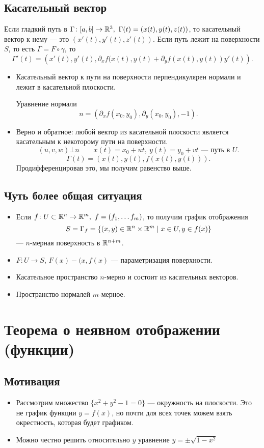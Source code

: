 \subsection{Касательный вектор}
\begin{defn}
	Если гладкий путь в $ \Gamma \colon [a,b] \to  \mathbb{R}^3, ~\Gamma (t) = \left( x(t), y(t), z(t) \right)  $, то {\sf касательный вектор} к нему --- это $ \left( x'(t), y'(t),z'(t) \right) $.  Если путь лежит на поверхности $ S$, то есть $ \Gamma = F \circ \gamma $, то
	\[
	    \Gamma '(t) = \left( x'(t), y'(t), \partial _xf(x(t), y(t) + \partial _yf(x(t), y(t))y'(t) \right)
	.\]
\end{defn}
\begin{itemize}
    \item Касательный вектор к пути на поверхности перпендикулярен нормали и лежит в касательной плоскости.

	{\sf Уравнение нормали}
	\[
	    n=\left( \partial _xf(x_0, y_0), \partial _y(x_0, y_0), -1 \right)
	.\]
    \item Верно и обратное:  любой вектор из касательной плоскости является касательным к некоторому пути на поверхности.
	\[
	    (u, v, w) \bot n \qquad x(t) = x_0+ ut, ~y(t) =y_0+vt \text{ --- путь в } U
	.\]
	\[
	    \Gamma (t) = (x(t), y(t), f(x(t), y(t)))
	.\]
	Продифференцировав это, мы получим равенство выше.
\end{itemize}
\subsection{Чуть более общая ситуация}
\begin{itemize}
    \item Если $ f\colon U \subset \mathbb{R}^{n} \to  \mathbb{R}^{m} , ~ f= (f_1, \ldots f_m)$, то получим график отображения
	\[
	    S = \Gamma _f = \{(x, y) \in \mathbb{R}^{n} \times \mathbb{R}^{m} \mid x \in U, y \in f(x)\}
	\]
	--- $ n$-мерная поверхность в  $ \mathbb{R}^{n+m}$.
    \item $ F\colon U \to  S$, $ F(x) - (x, f(x)$ --- параметризация поверхности.
    \item Касательное пространство $ n$-мерно и состоит из касательных векторов.
    \item Пространство нормалей  $ m$-мерное.
\end{itemize}
\section{Теорема о неявном отображении (функции)}
\subsection{Мотивация}
\begin{itemize}
    \item
	Рассмотрим множество $ \{x^2+y^2-1= 0\}$ --- окружность на плоскости. Это не график функции $ y = f(x)$, но почти для всех точек можем взять окрестность, которая будет графиком.
    \item  Можно честно решить относительно $ y$ уравнение  $ y = \pm \sqrt{1-x^2 } $
\end{itemize}


